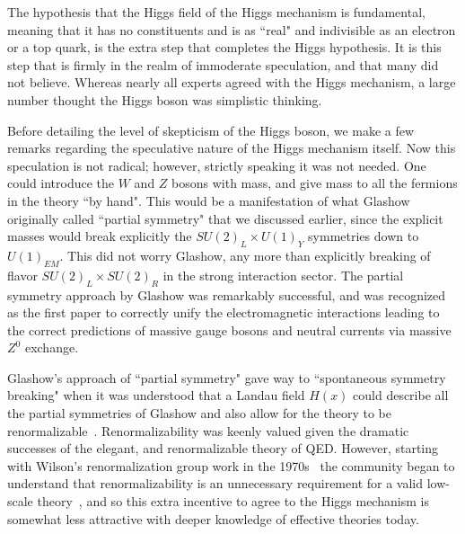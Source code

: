 \documentclass[letter,12pt]{article}
\begin{document}
The hypothesis that the Higgs field of the Higgs mechanism is fundamental, meaning that it has no constituents and is as ``real" and indivisible as an electron or a top quark, is the extra step that completes the Higgs hypothesis. It is this step that is firmly in the realm of immoderate speculation, and that many did not believe.  Whereas nearly all experts agreed with the Higgs mechanism, a large number thought the Higgs boson was simplistic thinking.

Before detailing the level of skepticism of the Higgs boson, we make a few remarks regarding the speculative nature of the Higgs mechanism itself. Now this speculation is not radical; however, strictly speaking it was not needed. One could introduce the $W$ and $Z$ bosons with mass, and give mass to all the fermions in the theory ``by hand". This would be a manifestation of what Glashow~\cite{Glashow:1961tr} originally called ``partial symmetry" that we discussed earlier, since the explicit masses would break explicitly the $SU(2)_L\times U(1)_Y$ symmetries down to $U(1)_{EM}$.  This did not worry Glashow, any more than explicitly breaking of flavor $SU(2)_L\times SU(2)_R$ in the strong interaction sector. %
The partial symmetry approach by Glashow was remarkably successful, and was recognized as the first paper to correctly unify the electromagnetic interactions leading to the correct predictions of massive gauge bosons and neutral currents via massive $Z^0$ exchange.

Glashow's approach of ``partial symmetry" gave way to ``spontaneous symmetry breaking" when it was understood that a Landau field $H(x)$ could describe all the partial symmetries of Glashow and also allow for the theory to be renormalizable~\cite{'tHooft:1971rn}. Renormalizability was keenly valued given the dramatic successes of the elegant, and renormalizable theory of QED. However, starting with Wilson's renormalization group work in the 1970s~\cite{Wilson:1973jj} the community began to understand that renormalizability is an unnecessary requirement for a valid low-scale theory~\cite{Weinberg:2016kyd,Wells:2012eff}, and so this extra incentive to agree to the Higgs mechanism is somewhat less attractive with deeper knowledge of effective theories today.
\end{document}
